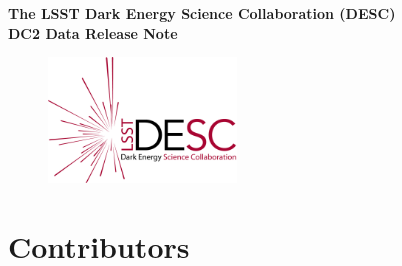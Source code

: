 \documentclass[11pt]{report}
\begin{document}

\pagestyle{empty}

\vspace*{0.2\textheight}

\begin{center}
{\Huge\bfseries The LSST Dark Energy Science Collaboration (DESC)\\
\bigskip DC2 Data Release Note}

\vspace*{0.2\textheight}



\vspace*{0.1\textheight}

\begin{figure}[!h]
\centering\includegraphics[width=5cm,angle=0]{inc/desc-logo.png}
\end{figure}

\end{center}

\clearpage


\clearpage

\section*{Contributors}




\clearpage
{\let\cleardoublepage\clearpage}

\vspace*{-1.0in}
\maketoc
\label{toc}

\clearpage

\pagestyle{fancy}
\fancyfoot{} %
\fancyfoot[R]{\thepage}  %

\fancyhead[L]{}
\renewcommand{\footrulewidth}{1pt}
\end{document}

